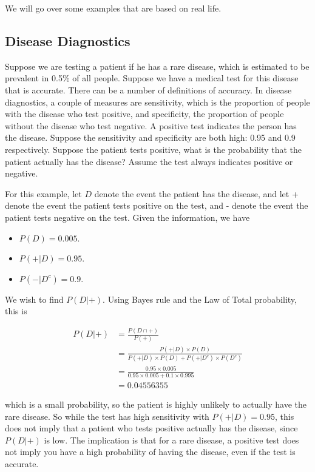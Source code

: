 \documentclass[
]{book}
\providecommand{\tightlist}{%
  \setlength{\itemsep}{0pt}\setlength{\parskip}{0pt}}
\begin{document}
We will go over some examples that are based on real life.

\hypertarget{disease-diagnostics}{%
\subsection{Disease Diagnostics}\label{disease-diagnostics}}

Suppose we are testing a patient if he has a rare disease, which is estimated to be prevalent in 0.5\% of all people. Suppose we have a medical test for this disease that is accurate. There can be a number of definitions of accuracy. In disease diagnostics, a couple of measures are sensitivity, which is the proportion of people with the disease who test positive, and specificity, the proportion of people without the disease who test negative. A positive test indicates the person has the disease. Suppose the sensitivity and specificity are both high: 0.95 and 0.9 respectively. Suppose the patient tests positive, what is the probability that the patient actually has the disease? Assume the test always indicates positive or negative.

For this example, let \(D\) denote the event the patient has the disease, and let + denote the event the patient tests positive on the test, and - denote the event the patient tests negative on the test. Given the information, we have

\begin{itemize}
\tightlist
\item
  \(P(D) = 0.005\).
\item
  \(P(+|D) = 0.95\).
\item
  \(P(-|D^c) = 0.9\).
\end{itemize}

We wish to find \(P(D|+)\). Using Bayes rule and the Law of Total probability, this is

\[
\begin{split}
P(D|+) &= \frac{P(D \cap +)}{P(+)}\\
 &= \frac{P(+|D) \times P(D)}{P(+|D) \times P(D) + P(+|D^c) \times P(D^c)} \\
&= \frac{0.95 \times 0.005}{0.95 \times 0.005 + 0.1 \times 0.995 }\\
&= 0.04556355
\end{split}
\]

which is a small probability, so the patient is highly unlikely to actually have the rare disease. So while the test has high sensitivity with \(P(+|D) = 0.95\), this does not imply that a patient who tests positive actually has the disease, since \(P(D|+)\) is low. The implication is that for a rare disease, a positive test does not imply you have a high probability of having the disease, even if the test is accurate.
\end{document}
